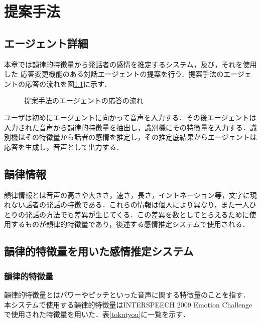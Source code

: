 %
\chapter{提案手法}
%
\section{エージェント詳細}
% 
本章では韻律的特徴量から発話者の感情を推定するシステム，及び，それを使用した
応答変更機能のある対話エージェントの提案を行う．提案手法のエージェントの応答の流れを図\ref{fig:system_pic31}に示す．

\begin{figure}[h]
	\centering
        \caption{提案手法のエージェントの応答の流れ}
        \label{fig:system_pic31}
	\centering
\end{figure}

ユーザは初めにエージェントに向かって音声を入力する．その後エージェントは入力された音声から韻律的特徴量を抽出し，識別機にその特徴量を入力する．識別機はその特徴量から話者の感情を推定し，その推定底結果からエージェントは応答を生成し，音声として出力する．
%
%
\section{韻律情報}
韻律情報とは音声の高さや大きさ，速さ，長さ，イントネーション等，文字に現れない話者の発話の特徴である．これらの情報は個人により異なり，また一人ひとりの発話の方法でも差異が生じてくる．この差異を数としてとらえるために使用するものが韻律的特徴量であり，後述する感情推定システムで使用される．

\section{韻律的特徴量を用いた感情推定システム}
%
\subsection{韻律的特徴量}
韻律的特徴量とはパワーやピッチといった音声に関する特徴量のことを指す．
本システムで使用する韻律的特徴量はINTERSPEECH 2009 Emotion Challenge\cite{tokutyou}で使用された特徴量を用いた．表\ref{tokutyou}に一覧を示す．

